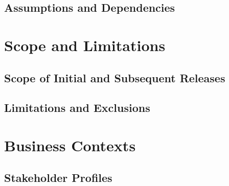 \documentclass[11pt,letterpaper,rotate]{article}
\begin{document}

\subsection{Assumptions and Dependencies}


\section{Scope and Limitations}


\subsection{Scope of Initial and Subsequent Releases}


\subsection{Limitations and Exclusions}


\section{Business Contexts}


\subsection{Stakeholder Profiles}
\end{document}
